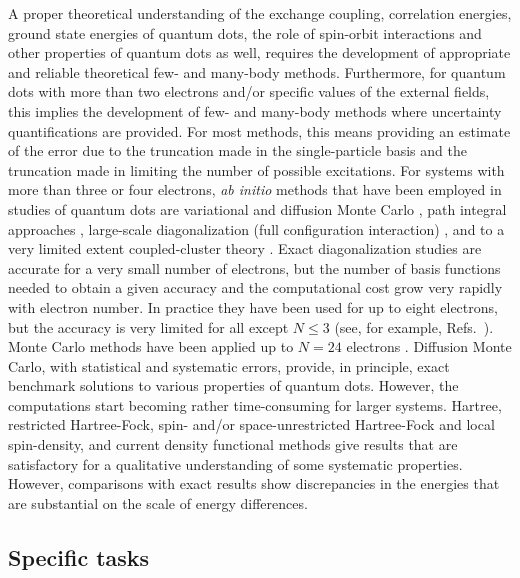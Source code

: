A proper theoretical understanding of the exchange coupling, correlation energies, 
ground state energies of quantum dots, the role of spin-orbit interactions
and other properties of quantum dots as well, requires the development of appropriate and reliable  
theoretical  few- and many-body methods. 
Furthermore, for quantum dots with more than two electrons and/or specific values of the 
external fields, this implies the development of few- and many-body methods where   
uncertainty
quantifications are provided.  
For most methods, this means providing an estimate of the error due 
to the truncation made in the single-particle basis and the truncation made in 
limiting the number of possible excitations.
For systems with more than three or four electrons,  {\em ab initio} methods that have 
been employed in studies of quantum dots are
 variational and diffusion Monte Carlo \cite{harju2005,pederiva2001, pederiva2003}, path integral approaches \cite{pi1999}, 
large-scale diagonalization (full configuration 
interaction) \cite{Eto97,Maksym90,simen2008,modena2000}, and to a very limited extent 
coupled-cluster theory \cite{shavittbartlett2009,bartlett2007,bartlett2003,indians,us2011}. 
Exact diagonalization studies are accurate for a very small number
of electrons, but the number of basis functions needed to obtain a given
accuracy and the computational cost grow very rapidly with electron number.
In practice they have been used for up to eight electrons\cite{Eto97,Maksym90,modena2000}, but the accuracy is
very limited for all except $N\le 3$ (see, for example, Refs.~).  
Monte Carlo methods have been applied up to $N=24$ electrons 
\cite{pederiva2001,pederiva2003}. Diffusion Monte Carlo, with statistical and systematic errors, provide, in principle,
exact benchmark solutions to various properties of quantum dots. However, 
the computations start becoming rather time-consuming for larger systems.   
Hartree\cite{Kum90}, restricted Hartree-Fock, spin- and/or space-unrestricted
Hartree-Fock\cite{Fuj96,Mul96,Yan99} and
local spin-density, and current density functional methods\cite{Kos97,Hir99,finns1,finns2}
give results that are satisfactory for a qualitative understanding of some
systematic properties. However, comparisons with exact results show
discrepancies in the energies that are substantial
on the scale of energy differences. 



\subsection*{Specific tasks}





